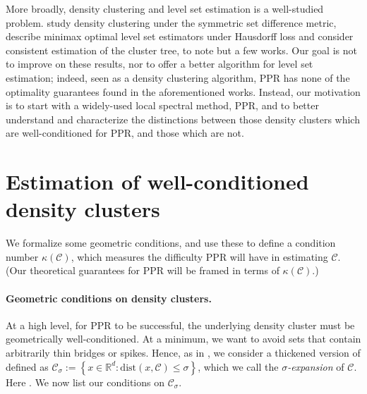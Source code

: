 \documentclass[11pt,twoside]{article}
\newcommand{\set}[1]{\left\{#1\right\}}
\newcommand{\Reals}{\mathbb{R}}
\newcommand{\norm}[1]{\left\lVert#1\right\rVert}
\newcommand{\1}{\mathbf{1}}
\newcommand{\dist}{\mathrm{dist}}
\newcommand{\Cbb}{\mathbb{C}}
\newcommand{\Cset}{\mathcal{C}}
\newcommand{\Csig}{\Cset_{\sigma}}
\begin{document}
More broadly, density clustering and level set estimation is a well-studied
problem. \citet{polonik1995, rigollet2009} study density clustering under the 
symmetric set difference metric, \citet{tsybakov1997, singh2009} describe
minimax optimal level set estimators under Hausdorff loss and
\citet{hartigan1981, chaudhuri2010} consider consistent estimation of the
cluster tree, to note but a few works. Our goal is not to improve on these
results, nor to offer a better algorithm for level set estimation; indeed, seen as
a density clustering algorithm, PPR has none of the optimality guarantees 
found in the aforementioned works. Instead, our motivation is to start with a 
widely-used local spectral method, PPR, and to better understand and
characterize the distinctions between those density clusters which are
well-conditioned for PPR, and those which are not. 

\section{Estimation of well-conditioned density clusters}
\label{sec: consistent_cluster_estimation_with_ppr}

We formalize some geometric conditions, and use these to define a condition
number $\kappa(\Cset)$, which measures the difficulty PPR will have in  
estimating $\Cset$. (Our theoretical guarantees for PPR will be framed in terms 
of $\kappa(\Cset)$.)

\paragraph{Geometric conditions on density clusters.} At a high level, for PPR
to be successful, the underlying density cluster must be geometrically
well-conditioned.  At a minimum, we want to avoid sets that contain arbitrarily
thin bridges or spikes.  Hence, as in \citet{chaudhuri2010}, we consider a
thickened version of \smash{$\Cset \in \Cbb_f(\lambda)$} defined as 
$\Csig := \set{x \in \Reals^d: \dist(x,\Cset) \leq \sigma}$, which 
we call the \emph{$\sigma$-expansion} of $\Cset$. Here 
\smash{$\dist(x,\Cset) := \inf_{y \in \Cset} \norm{y - x}$}.  We now list our
conditions on $\Csig$.
\end{document}
